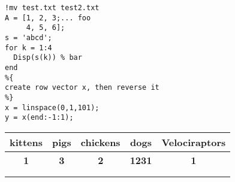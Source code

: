 \documentclass[12pt, letterpaper]{article}
\begin{document}
\newpage



\begin{lstlisting}[style=Matlab-editor]
%% Sample Matlab code
!mv test.txt test2.txt
A = [1, 2, 3;... foo
     4, 5, 6];
s = 'abcd';
for k = 1:4
  Disp(s(k)) % bar
end
%{
create row vector x, then reverse it
%}
x = linspace(0,1,101);
y = x(end:-1:1);
\end{lstlisting}





\begin{table}[H]
\centering
\begin{tabular}{|c|c|c|c|c|}
\hline
\rowcolor[HTML]{FE996B} 
\textbf{kittens} & \textbf{pigs} & \textbf{chickens} & \textbf{dogs} & \textbf{Velociraptors} \\ \hline
\textbf{1}       & \textbf{3}    & \textbf{2}        & \textbf{1231} & \textbf{1}             \\ \hline
\textbf{}        & \textbf{}     & \textbf{}         & \textbf{}     & \textbf{}              \\ \hline
\textbf{}        & \textbf{}     & \textbf{}         & \textbf{}     & \textbf{}              \\ \hline
\end{tabular}
\end{table}
\end{document}
